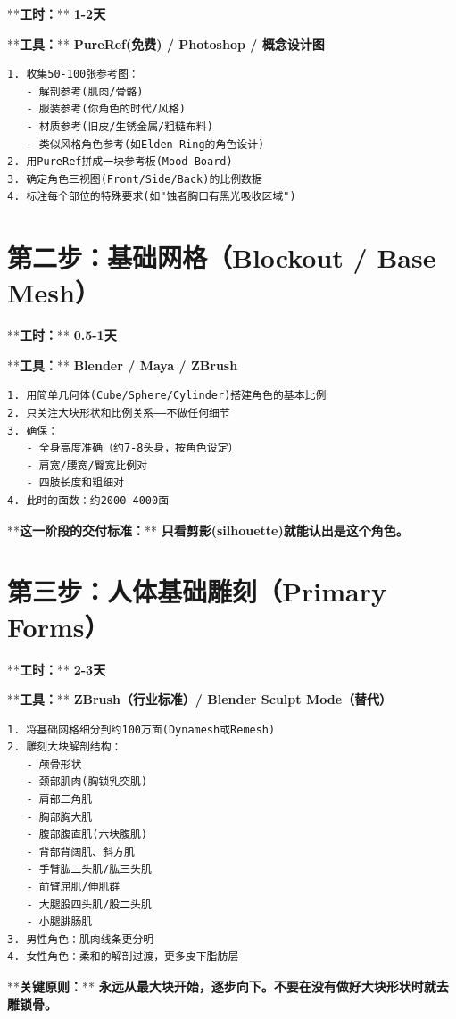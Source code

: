 \documentclass[12pt,a4paper,openany]{ctexbook}
\begin{document}
**\textbf{工时：}**\textbf{ 1-2天}

**\textbf{工具：}**\textbf{ PureRef(免费) / Photoshop / 概念设计图}


\begin{verbatim}
1. 收集50-100张参考图：
   - 解剖参考(肌肉/骨骼)
   - 服装参考(你角色的时代/风格)
   - 材质参考(旧皮/生锈金属/粗糙布料)
   - 类似风格角色参考(如Elden Ring的角色设计)
2. 用PureRef拼成一块参考板(Mood Board)
3. 确定角色三视图(Front/Side/Back)的比例数据
4. 标注每个部位的特殊要求(如"蚀者胸口有黑光吸收区域")
\end{verbatim}


\section*{第二步：基础网格（Blockout / Base Mesh）}


**\textbf{工时：}**\textbf{ 0.5-1天}

**\textbf{工具：}**\textbf{ Blender / Maya / ZBrush}


\begin{verbatim}
1. 用简单几何体(Cube/Sphere/Cylinder)搭建角色的基本比例
2. 只关注大块形状和比例关系——不做任何细节
3. 确保：
   - 全身高度准确（约7-8头身，按角色设定）
   - 肩宽/腰宽/臀宽比例对
   - 四肢长度和粗细对
4. 此时的面数：约2000-4000面
\end{verbatim}


**\textbf{这一阶段的交付标准：}**\textbf{ 只看剪影(silhouette)就能认出是这个角色。}


\section*{第三步：人体基础雕刻（Primary Forms）}


**\textbf{工时：}**\textbf{ 2-3天}

**\textbf{工具：}**\textbf{ ZBrush（行业标准）/ Blender Sculpt Mode（替代）}


\begin{verbatim}
1. 将基础网格细分到约100万面(Dynamesh或Remesh)
2. 雕刻大块解剖结构：
   - 颅骨形状
   - 颈部肌肉(胸锁乳突肌)
   - 肩部三角肌
   - 胸部胸大肌
   - 腹部腹直肌(六块腹肌)
   - 背部背阔肌、斜方肌
   - 手臂肱二头肌/肱三头肌
   - 前臂屈肌/伸肌群
   - 大腿股四头肌/股二头肌
   - 小腿腓肠肌
3. 男性角色：肌肉线条更分明
4. 女性角色：柔和的解剖过渡，更多皮下脂肪层
\end{verbatim}


**\textbf{关键原则：}**\textbf{ 永远从最大块开始，逐步向下。不要在没有做好大块形状时就去雕锁骨。}
\end{document}
